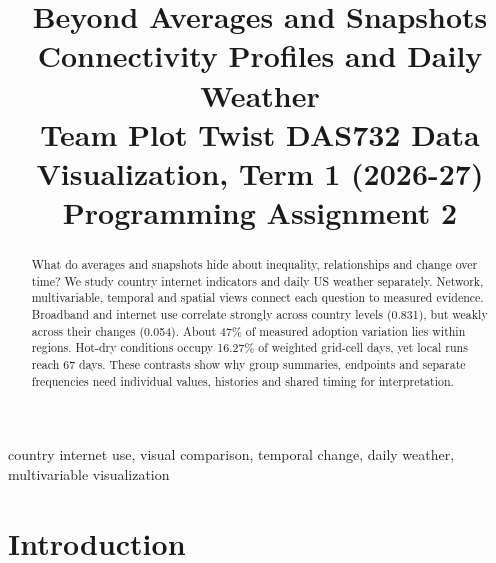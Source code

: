 \documentclass[conference,a4paper]{IEEEtran}
\begin{document}
\raggedbottom
\title{Beyond Averages and Snapshots\\{\large Connectivity Profiles and Daily Weather}\\[3pt]{\normalsize Team Plot Twist \textbullet{} DAS732 Data Visualization, Term 1 (2026-27)}\\{\normalsize Programming Assignment 2}}
\author{
\and
{}
\and
{}
}
\maketitle
\pagestyle{plain}
\thispagestyle{plain}



\begin{abstract}What do averages and snapshots hide about inequality, relationships and change over time? We study country internet indicators and daily US weather separately. Network, multivariable, temporal and spatial views connect each question to measured evidence. Broadband and internet use correlate strongly across country levels (0.831), but weakly across their changes (0.054). About 47\% of measured adoption variation lies within regions. Hot-dry conditions occupy 16.27\% of weighted grid-cell days, yet local runs reach 67 days. These contrasts show why group summaries, endpoints and separate frequencies need individual values, histories and shared timing for interpretation.\end{abstract}

\begin{IEEEkeywords}country internet use, visual comparison, temporal change, daily weather, multivariable visualization\end{IEEEkeywords}

\section{Introduction}
\end{document}
